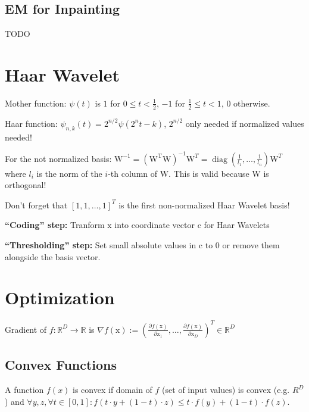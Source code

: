 \documentclass[a4paper, 11pt, landscape]{article}
\newcommand{\matr}[1]{\boldsymbol{\mathrm{#1}}}
\begin{document}
\begin{multicols*}{3}
\subsection{EM for Inpainting}
TODO

\section{Haar Wavelet}
\begin{compactdesc}
	\item[Mother function:] $\psi(t)$ is $1$ for $0 \leq t < \frac{1}{2}$, $-1$ for $\frac{1}{2} \leq t < 1$, $0$ otherwise.
	\item[Haar function:] $\psi_{n,k}(t) = 2^{n/2} \psi(2^n t - k)$, $2^{n/2}$ only needed if normalized values needed!
\end{compactdesc}

\begin{compactitem}
	\item For the not normalized basis: $\matr{W}^{-1} = (\matr{W^T} \matr{W})^{-1} \matr{W}^T = \operatorname{diag}(\frac{1}{l_1}, \ldots, \frac{1}{l_n}) \matr{W}^T$ where $l_i$ is the norm of the $i$-th column of $\matr{W}$. This is valid because $\matr{W}$ is orthogonal!
	\item Don't forget that $[1, 1, \ldots, 1]^T$ is the first non-normalized Haar Wavelet basis!
	\item \textbf{``Coding'' step:} Tranform $\matr{x}$ into coordinate vector $\matr{c}$ for Haar Wavelets
	\item \textbf{``Thresholding'' step:} Set small absolute values in $\matr{c}$ to $0$ or remove them alongside the basis vector.
\end{compactitem}

\section{Optimization}
Gradient of $f: \mathbb{R}^D \to \mathbb{R}$ is $\nabla f(\matr{x}) := \left( \frac{\partial f(\matr{x})}{\partial \matr{x}_1}, \ldots, \frac{\partial f(\matr{x})}{\partial \matr{x}_D} \right)^T \in \mathbb{R}^D$

\subsection{Convex Functions}
A function $f(x)$ is convex if domain of $f$ (set of input values) is convex (e.g. $R^D$) and $\forall y, z, \forall t \in [0, 1]: f(t \cdot y + (1-t) \cdot z) \leq t \cdot f(y) + (1-t) \cdot f(z)$.


\end{multicols*}
\end{document}
